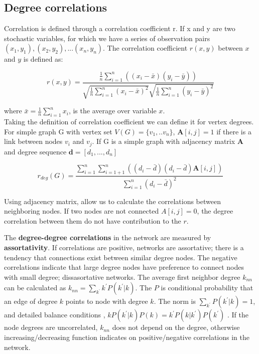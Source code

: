 \subsection{Degree correlations}

Correlation is defined through a correlation coefficient r. If x and y are two stochastic variables, for which we have a series of observation pairs $(x_1, y_1), (x_2, y_2), ... (x_n, y_n)$. The correlation coefficient $r(x, y)$ between $x$ and $y$ is defined as:

\begin{equation}
r(x, y) = \frac{\frac{1}{n}\sum_{i=1}^{n}((x_i - \bar{x} ) (y_i - \bar{y}) )}{\sqrt{\frac{1}{n}\sum_{i=1}^{n}(x_i - \bar{x})^2} \sqrt{\frac{1}{n}\sum_{i=1}^{n}(y_i - \bar{y})^2} }
\end{equation}

where $\bar{x} = \frac{1}{n}\sum_{i=1}^{n}x_i$, is the average over variable $x$. \\

Taking the definition of correlation coefficient we can define it for vertex degrees. For simple graph G with vertex set $V(G) = \{v_1, ..v_n\}$, $\boldsymbol{A}[i,j] = 1$ if there is a link between nodes $v_i$ and $v_j$. If G is a simple graph with adjacency matrix $\boldsymbol{A}$ and degree sequence $\boldsymbol{d} = [d_1, ..., d_n]$

\begin{equation}
r_{deg}(G) = \frac{\sum_{i=1}^{n}\sum_{i=1+1}^{n}((d_i - \bar{d}) (d_i - \bar{d}) \boldsymbol{A}[i,j] )}{\sum_{i=1}^{n}(d_i - \bar{d})^2}
\end{equation}

Using adjacency matrix, allow us to calculate the correlations between neighboring nodes. If two nodes are not connected $A[i,j]=0$, the degree correlation between them do not have contribution to the $r$.

The \textbf{degree-degree correlations} in the network are measured by \textbf{assortativity}. If correlations are positive, networks are assortative; there is a tendency that connections exist between similar degree nodes. The negative correlations indicate that large degree nodes have preference to connect nodes with small degree; dissasortative networks. The average first neighbor degree $k_{nn}$ can be calculated as $k_{nn} = \sum_{k^{'}}k^{'}P(k^{'}|{k})$. The $P$ is conditional probability that an edge of degree $k$ points to node with degree $k$. The norm is $\sum_{k^{'}}P(k^{'}|k)=1$, and detailed balance conditions \cite{boccaletti2006},  $kP(k^{'}|k)P(k) = k^{'}P(k|k^{'})P(k^{'})$ \cite{boccaletti2006}. If the node degrees are uncorrelated, $k_{nn}$ does not depend on the degree, otherwise increasing/decreasing function indicates on positive/negative correlations in the network. \\


